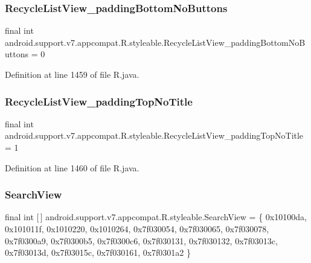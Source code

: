 \subsubsection{\texorpdfstring{RecycleListView\_paddingBottomNoButtons}{RecycleListView\_paddingBottomNoButtons}}
{\footnotesize\ttfamily final int android.\+support.\+v7.\+appcompat.\+R.\+styleable.\+Recycle\+List\+View\+\_\+padding\+Bottom\+No\+Buttons = 0\hspace{0.3cm}{\ttfamily [static]}}



Definition at line 1459 of file R.\+java.

\mbox{\label{classandroid_1_1support_1_1v7_1_1appcompat_1_1_r_1_1styleable_ad34edee58427a47969dad87c706d3b56}} 
\subsubsection{\texorpdfstring{RecycleListView\_paddingTopNoTitle}{RecycleListView\_paddingTopNoTitle}}
{\footnotesize\ttfamily final int android.\+support.\+v7.\+appcompat.\+R.\+styleable.\+Recycle\+List\+View\+\_\+padding\+Top\+No\+Title = 1\hspace{0.3cm}{\ttfamily [static]}}



Definition at line 1460 of file R.\+java.

\mbox{\label{classandroid_1_1support_1_1v7_1_1appcompat_1_1_r_1_1styleable_a01af09df9e38f1e4f57165c3d3cee9fe}} 
\subsubsection{\texorpdfstring{SearchView}{SearchView}}
{\footnotesize\ttfamily final int \mbox{[}$\,$\mbox{]} android.\+support.\+v7.\+appcompat.\+R.\+styleable.\+Search\+View = \{ 0x10100da, 0x101011f, 0x1010220, 0x1010264, 0x7f030054, 0x7f030065, 0x7f030078, 0x7f0300a9, 0x7f0300b5, 0x7f0300c6, 0x7f030131, 0x7f030132, 0x7f03013c, 0x7f03013d, 0x7f03015c, 0x7f030161, 0x7f0301a2 \}\hspace{0.3cm}{\ttfamily [static]}}



